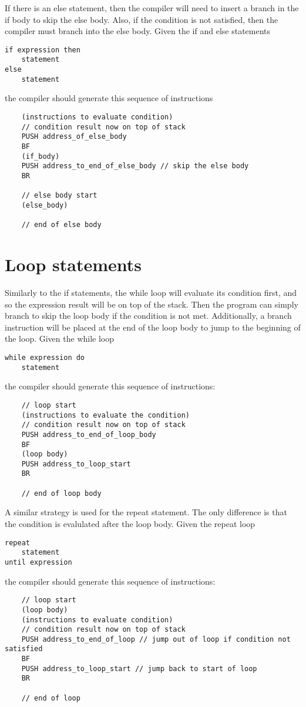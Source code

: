 \documentclass{article}
\begin{document}
\noindent
If there is an else statement, then the compiler will need to insert a branch in the if body to skip the else body. Also, if the condition is not satisfied, then the compiler must branch into the else body.
\newline
Given the if and else statements
\begin{lstlisting}
if expression then
    statement
else
    statement
\end{lstlisting}
the compiler should generate this sequence of instructions
\begin{lstlisting}
    (instructions to evaluate condition)
    // condition result now on top of stack
    PUSH address_of_else_body
    BF
    (if_body)
    PUSH address_to_end_of_else_body // skip the else body
    BR
    
    // else body start
    (else_body)
    
    // end of else body
\end{lstlisting}

\newpage
\section{Loop statements}
Similarly to the if statements, the while loop will evaluate its condition first, and so the expression result will be on top of the stack. Then the program can simply branch to skip the loop body if the condition is not met. Additionally, a branch instruction will be placed at the end of the loop body to jump to the beginning of the loop.
\newline
\newline
Given the while loop
\begin{lstlisting}
while expression do
    statement
\end{lstlisting}
the compiler should generate this sequence of instructions:
\begin{lstlisting}
    // loop start
    (instructions to evaluate the condition)
    // condition result now on top of stack
    PUSH address_to_end_of_loop_body
    BF
    (loop body)
    PUSH address_to_loop_start
    BR
    
    // end of loop body
\end{lstlisting}
\newline
A similar strategy is used for the repeat statement. The only difference is that the condition is evalulated after the loop body.
Given the repeat loop
\begin{lstlisting}
repeat
    statement
until expression
\end{lstlisting}
the compiler should generate this sequence of instructions:
\begin{lstlisting}
    // loop start
    (loop body)
    (instructions to evaluate condition)
    // condition result now on top of stack
    PUSH address_to_end_of_loop // jump out of loop if condition not satisfied
    BF
    PUSH address_to_loop_start // jump back to start of loop
    BR
    
    // end of loop
\end{lstlisting}
\end{document}
